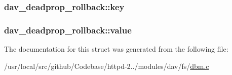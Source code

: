 \subsubsection[{\texorpdfstring{key}{key}}]{ dav\+\_\+deadprop\+\_\+rollback\+::key}\hypertarget{structdav__deadprop__rollback_a04f9233f1afbe8f30acf8cee35b19aae}{}\label{structdav__deadprop__rollback_a04f9233f1afbe8f30acf8cee35b19aae}
\subsubsection[{\texorpdfstring{value}{value}}]{ dav\+\_\+deadprop\+\_\+rollback\+::value}\hypertarget{structdav__deadprop__rollback_a731262827a38ee646bb9197dfe53d8fd}{}\label{structdav__deadprop__rollback_a731262827a38ee646bb9197dfe53d8fd}


The documentation for this struct was generated from the following file\+:\begin{DoxyCompactItemize}
\item 
/usr/local/src/github/\+Codebase/httpd-\/2../modules/dav/fs/\hyperlink{dbm_8c}{dbm.\+c}\end{DoxyCompactItemize}
